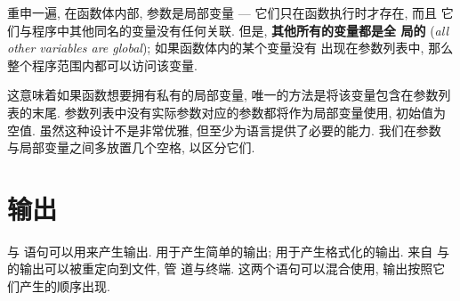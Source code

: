 重申一遍, 在函数体内部, 参数是局部变量 --- 它们只在函数执行时才存在, 而且 
它们与程序中其他同名的变量没有任何关联. 但是, \textbf{其他所有的变量都是全
局的} (\emph{all other variables are global}); 如果函数体内的某个变量没有
出现在参数列表中, 那么整个程序范围内都可以访问该变量.

这意味着如果函数想要拥有私有的局部变量, 唯一的方法是将该变量包含在参数列
表的末尾. 参数列表中没有实际参数对应的参数都将作为局部变量使用, 初始值为
空值. 虽然这种设计不是非常优雅, 但至少为语言提供了必要的能力. 我们在参数
与局部变量之间多放置几个空格, 以区分它们.

\section{输出}
\label{sec:output}

\print 与 \printf 语句可以用来产生输出. \print 用于产生简单的输出; \printf 
用于产生格式化的输出. 来自 \print 与 \printf 的输出可以被重定向到文件, 管
道与终端. 这两个语句可以混合使用, 输出按照它们产生的顺序出现.

